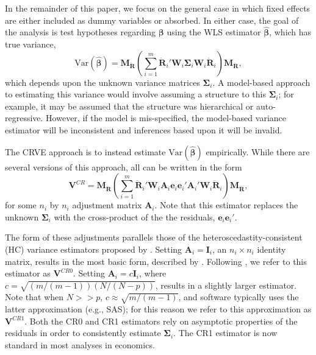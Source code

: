 \documentclass[12pt]{article}\usepackage[]{graphicx}\usepackage[]{color}
\newcommand{\Var}{\text{Var}}
\newcommand{\bm}{\mathbf}
\newcommand{\bs}{\boldsymbol}
\begin{document}
In the remainder of this paper, we focus on the general case in which fixed effects are either included as dummy variables or absorbed. 
In either case, the goal of the analysis is test hypotheses regarding $\bs\beta$ using the WLS estimator $\bs{\hat\beta}$, which has true variance,
\begin{equation}
\label{eq:var_WLS}
\Var\left(\bs{\hat\beta}\right) = \bm{M_{\ddot{R}}}\left(\sum_{i=1}^m \bm{\ddot{R}}_i' \bm{W}_i \bs\Sigma_i \bm{W}_i\bm{\ddot{R}}_i\right) \bm{M_{\ddot{R}}},
\end{equation}
which depends upon the unknown variance matrices $\bm\Sigma_i$. 
A model-based approach to estimating this variance would involve assuming a structure to this $\bm\Sigma_i$; for example, it may be assumed that the structure was hierarchical or auto-regressive. 
However, if the model is mis-specified, the model-based variance estimator will be inconsistent and inferences based upon it will be invalid.

The CRVE approach is to instead estimate $\Var\left(\bs{\hat\beta}\right)$ empirically. 
While there are several versions of this approach, all can be written in the form
\begin{equation}
\label{eq:V_small}
\bm{V}^{CR} = \bm{M_{\ddot{R}}}\left(\sum_{i=1}^m \bm{\ddot{R}}_i'\bm{W}_i \bm{A}_i \bm{e}_i \bm{e}_i' \bm{A}_i' \bm{W}_i \bm{\ddot{R}}_i\right) \bm{M_{\ddot{R}}},
\end{equation}
for some $n_i$ by $n_i$ adjustment matrix $\bm{A}_i$. 
Note that this estimator replaces the unknown $\bm\Sigma_i$ with the cross-product of the the residuals, $\bm{e}_i \bm{e}_i'$. 

The form of these adjustments parallels those of the heteroscedastity-consistent (HC) variance estimators proposed by \citet*{MacKinnon1985some}. 
Setting $\bm{A}_i = \bm{I}_i$, an $n_i \times n_i$ identity matrix, results in the most basic form, described by \citet{Liang1986longitudinal}. 
Following \citet{Cameron2015practitioners}, we refer to this estimator as $\bm{V}^{CR0}$. 
Setting $\bm{A}_i = c\bm{I}_i$, where $c = \sqrt{(m/(m-1))(N/(N - p))}$, results in a slightly larger estimator.
Note that when $N >> p$, $c \approx \sqrt{m/(m-1)}$, and software typically uses the latter approximation (e.g., SAS); for this reason we refer to this approximation as $\bm{V}^{CR1}$.
Both the CR0 and CR1 estimators rely on asymptotic properties of the residuals in order to consistently estimate $\bs\Sigma_i$. 
The CR1 estimator is now standard in most analyses in economics.
\end{document}
